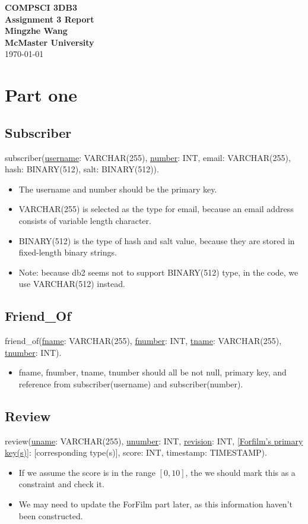 \documentclass[11pt,fleqn]{exam}
\newcommand{\mn}[1]{\mbox{\sf #1}}
\begin{document}
	
	\begin{center}
		
		{\large \textbf{COMPSCI 3DB3}}\\[2mm]
		{\huge \textbf{Assignment 3 Report}}\\[6mm]
		{\large \textbf{Mingzhe Wang}}\\[2mm]
		{\large \textbf{McMaster University}}\\[6mm]
		{\large \today}
		
	\end{center}
	
\medskip
\section*{Part one}
\subsection*{Subscriber}
subscriber(\underline{username}: VARCHAR(255), \underline{number}: INT, email: VARCHAR(255), hash: BINARY(512), salt: BINARY(512)).
\begin{itemize}
\item The username and number should be the primary key. 
\item \mn{VARCHAR(255)} is selected as the type for email, because an email address consists of variable length character.
\item \mn{BINARY(512)} is the type of hash and salt value, because they are stored in fixed-length binary strings.
\item Note: because db2 seems not to support \mn{BINARY(512)} type, in the code, we use VARCHAR(512) instead.
\end{itemize}

\subsection*{Friend\_Of}
friend\_of(\underline{fname}: VARCHAR(255), \underline{fnumber}: INT, \underline{tname}: VARCHAR(255), \underline{tnumber}: INT).
\begin{itemize}
\item fname, fnumber, tname, tnumber should all be not null, primary key, and reference from subscriber(username) and subscriber(number).
\end{itemize}

\subsection*{Review}
review(\underline{uname}: VARCHAR(255), \underline{unumber}: INT,  \underline{revision}: INT, \underline{[Forfilm's primary key(s)]}: [corresponding type(s)], score: INT, timestamp: TIMESTAMP).
\begin{itemize}
\item If we assume the score is in the range $[0, 10]$, the we should mark this as a constraint and check it.
\item We may need to update the ForFilm part later, as this information haven't been constructed.
\end{itemize}
\end{document}
